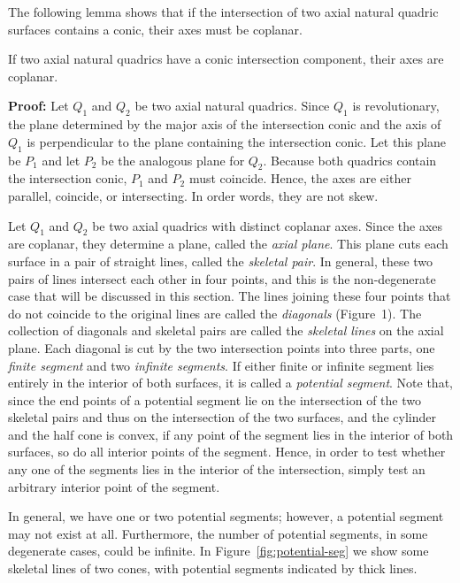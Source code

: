      The following lemma shows that if the intersection of two axial natural 
quadric surfaces contains a conic, their axes must be coplanar.

\begin{lemma}
\label{lemma:non-skew}
     If two axial natural quadrics have a conic intersection component, their 
axes are coplanar.  
\end{lemma}
{\bf Proof:}  Let $Q_1$ and $Q_2$ be two axial natural quadrics.  Since $Q_1$ 
is revolutionary, the plane determined by the major axis of the intersection 
conic and the axis of $Q_1$ is perpendicular to the plane containing the 
intersection conic.  Let this plane be $P_1$ and let $P_2$ be the analogous 
plane for $Q_2$.  Because both quadrics contain the intersection conic, $P_1$ 
and $P_2$ must coincide.  Hence, the axes are either parallel, coincide, or 
intersecting.  In order words, they are not skew.\ \ \ \QED

     Let $Q_1$ and $Q_2$ be two axial quadrics with distinct coplanar axes.
Since the axes are coplanar, they determine a plane, called the {\em axial 
plane}.  This plane cuts each surface in a pair of straight lines, called the 
{\em skeletal pair}.  In general, these two 
pairs of lines intersect each other in four points, and this is the 
non-degenerate case that will be discussed in this section.  The lines joining
these four points that do not coincide to the original lines are called the 
{\em diagonals} (Figure~1).
The collection of diagonals and skeletal pairs are called the
{\em skeletal lines} on the axial plane.  Each diagonal is cut by the two 
intersection points into three parts, one {\em finite segment} and two 
{\em infinite segments}.  If either finite or infinite segment lies entirely 
in the interior of both surfaces, it is called a {\em potential segment}.  
Note that, since the end points of a potential segment lie on the intersection 
of the two skeletal pairs and thus on the intersection of the two surfaces, 
and the cylinder and the half cone is convex, if any point of the segment lies 
in the interior of both surfaces, so do all interior points of the segment.  
Hence, in order to test whether any one of the segments lies in the interior 
of the intersection, simply test an arbitrary interior point of the segment.

     In general, we have one or two potential segments; however, a potential
segment may not exist at all.  Furthermore, the number of potential segments,
in some degenerate cases, could be infinite.   
In Figure~\ref{fig:potential-seg} we show some skeletal lines of two cones,
with potential segments indicated by thick lines.

